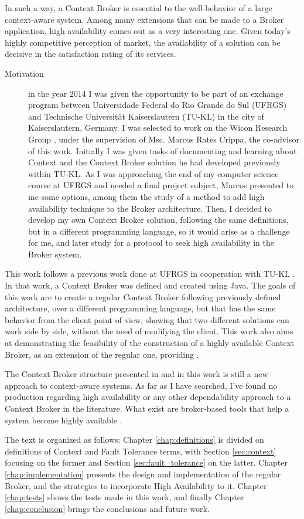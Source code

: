 In such a way, a Context Broker is essential to the well-behavior of a large context-aware system. Among many extensions that can be made to a Broker application, high availability comes out as a very interesting one. Given today's highly competitive perception of market, the availability of a solution can be decisive in the satisfaction rating of its services.


\begin{description}
\item[Motivation] in the year 2014 I was given the opportunity to be part of an exchange program between Universidade Federal do Rio Grande do Sul (UFRGS) and Technische Universität Kaiserslautern (TU-KL) in the city of Kaiserslautern, Germany. I was selected to work on the Wicon Research Group \cite{wicon}, under the supervision of Msc. Marcos Rates Crippa, the co-advisor of this work. Initially I was given tasks of documenting and learning about Context and the Context Broker solution he had developed previously within TU-KL. As I was approaching the end of my computer science course at UFRGS and needed a final project subject, Marcos presented to me some options, among them the study of a method to add high availability technique to the Broker architecture. Then, I decided to develop my own Context Broker solution, following the same definitions, but in a different programming language, so it would arise as a challenge for me, and later study for a protocol to seek high availability in the Broker system.

\end{description}

This work follows a previous work done at UFRGS in cooperation with TU-KL \cite{crippa2010}. In that work, a Context Broker was defined and created using Java. The goals of this work are to create a regular Context Broker following previously defined architecture, over a different programming language, but that has the same behavior from the client point of view, showing that two different solutions can work side by side, without the need of modifying the client. This work also aims at demonstrating the feasibility of the construction of a highly available Context Broker, as an extension of the regular one, providing .

The Context Broker structure presented in \cite{crippa2010} and in this work is still a new approach to context-aware systems. As far as I have searched, I've found no production regarding high availability or any other dependability approach to a Context Broker in the literature. What exist are broker-based tools that help a system become highly available \cite{maffeis1997constructing} \cite{natarajan2000doors}.

The text is organized as follows: Chapter \ref{chap:definitions} is divided on definitions of Context and Fault Tolerance terms, with Section \ref{sec:context} focusing on the former and Section \ref{sec:fault_tolerance} on the latter. Chapter \ref{chap:implementation} presents the design and implementation of the regular Broker, and the strategies to incorporate High Availability to it. Chapter \ref{chap:tests} shows the tests made in this work, and finally Chapter \ref{chap:conclusion} brings the conclusions and future work.